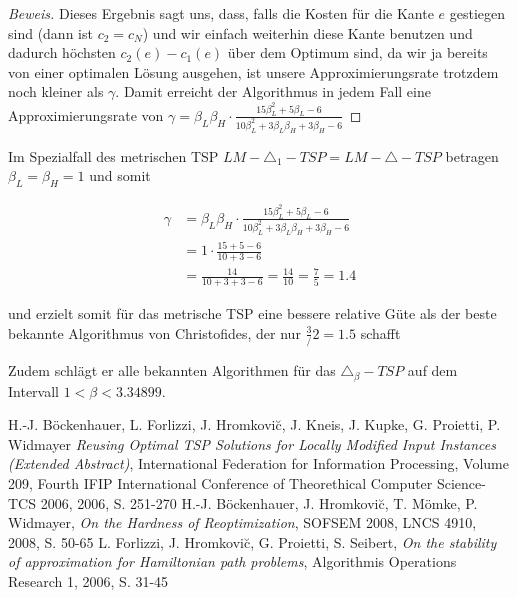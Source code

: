 \documentclass[a4paper,11pt]{scrreprt}
\begin{document}
\begin{proof}[Beweis]
Dieses Ergebnis sagt uns, dass, falls die Kosten für die Kante $e$ gestiegen sind (dann ist $c_2 = c_N$) und wir einfach weiterhin diese Kante benutzen und dadurch höchsten $c_2(e) - c_1(e)$ über dem Optimum sind, da wir ja bereits von einer optimalen Lösung ausgehen, ist unsere Approximierungsrate trotzdem noch kleiner als $\gamma$. Damit erreicht der Algorithmus in jedem Fall eine Approximierungsrate von $\gamma = \beta_L\beta_H \cdot \frac{15\beta_L^2 + 5\beta_L - 6}{10\beta_L^2 + 3\beta_L\beta_H + 3\beta_H -6}$
\end{proof}

Im Spezialfall des metrischen TSP $LM - \triangle_1 - TSP = LM - \triangle - TSP$ betragen $\beta_L = \beta_H = 1$ und somit

\begin{align*}
\gamma &= \beta_L\beta_H \cdot \frac{15\beta_L^2 + 5\beta_L - 6}{10\beta_L^2 + 3\beta_L\beta_H + 3\beta_H -6}\\
&= 1 \cdot \frac{15 + 5 - 6}{10 + 3 - 6}\\
&= \frac{14}{10 + 3 + 3 - 6} = \frac{14}{10} = \frac{7}{5} = 1.4
\end{align*}

und erzielt somit für das metrische TSP eine bessere relative Güte als der beste bekannte Algorithmus von Christofides, der nur $\frac{3}/{2} = 1.5$ schafft

Zudem schlägt er alle bekannten Algorithmen für das $\triangle_\beta-TSP$ auf dem Intervall $1 < \beta < 3.34899$.

\begin{thebibliography}{9}

  H.-J. Böckenhauer, L. Forlizzi, J. Hromkovi\u{c}, J. Kneis, J. Kupke, G. Proietti, P. Widmayer 
  \emph{Reusing Optimal TSP Solutions for Locally Modified Input Instances (Extended Abstract)},
  International Federation for Information Processing, Volume 209, Fourth IFIP International Conference of Theorethical Computer Science-TCS 2006, 2006, S. 251-270
  H.-J. Böckenhauer, J. Hromkovi\u{c}, T. Mömke, P. Widmayer,
  \emph{On the Hardness of Reoptimization},
  SOFSEM 2008, LNCS 4910, 2008, S. 50-65
  L. Forlizzi, J. Hromkovi\u{c}, G. Proietti, S. Seibert,
  \emph{On the stability of approximation for Hamiltonian path problems},
  Algorithmis Operations Research 1, 2006, S. 31-45

\end{thebibliography}
  
\end{document}
